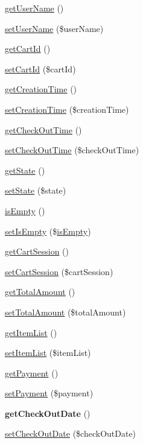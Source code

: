 \begin{DoxyCompactItemize}
\item 
\hyperlink{class_cart_aafd6d1ef27e6acc5833aba4012e5ee77}{get\+User\+Name} ()
\item 
\hyperlink{class_cart_a20f0087f72763b84d2992ba6ffee2fb2}{set\+User\+Name} (\$user\+Name)
\item 
\hyperlink{class_cart_a9fccf5809640808cf3900de0fbaf4765}{get\+Cart\+Id} ()
\item 
\hyperlink{class_cart_a241a4f559865249d8fdc9d9e9f3ae05f}{set\+Cart\+Id} (\$cart\+Id)
\item 
\hyperlink{class_cart_a8af92ba90a86c8c4abaf02cc314440f1}{get\+Creation\+Time} ()
\item 
\hyperlink{class_cart_abc11abf7b11b2b11588269d0b3d28b26}{set\+Creation\+Time} (\$creation\+Time)
\item 
\hyperlink{class_cart_a308c0ec3e87adb5aec040275fbaa5399}{get\+Check\+Out\+Time} ()
\item 
\hyperlink{class_cart_ac01239e64294f9d363a393e1bd30d37e}{set\+Check\+Out\+Time} (\$check\+Out\+Time)
\item 
\hyperlink{class_cart_afbf787ced76807989fb3093e1772c5a1}{get\+State} ()
\item 
\hyperlink{class_cart_a94042b70768a686decc42594ef36bbd6}{set\+State} (\$state)
\item 
\hyperlink{class_cart_aedcc52b3673b8df9425e52f13accb2a1}{is\+Empty} ()
\item 
\hyperlink{class_cart_a2dde1e2c7c90f8666f4869b32c36d056}{set\+Is\+Empty} (\$\hyperlink{class_cart_aedcc52b3673b8df9425e52f13accb2a1}{is\+Empty})
\item 
\hyperlink{class_cart_add88f03826fea4674a657dbb7062e559}{get\+Cart\+Session} ()
\item 
\hyperlink{class_cart_a48191a8dbb8f95ac925654237a22e6a1}{set\+Cart\+Session} (\$cart\+Session)
\item 
\hyperlink{class_cart_ae305b3e3acedd1fa9854e72f83af22c1}{get\+Total\+Amount} ()
\item 
\hyperlink{class_cart_a56860f621c6e6e47042e41fa4e59d13b}{set\+Total\+Amount} (\$total\+Amount)
\item 
\hyperlink{class_cart_a72c1264f490b6d6e5e7ba32d10fb782d}{get\+Item\+List} ()
\item 
\hyperlink{class_cart_a6fc63808e879d9282b89cc0ec214aba9}{set\+Item\+List} (\$item\+List)
\item 
\hyperlink{class_cart_a741dd11df6270bd98ec46727d5c451a4}{get\+Payment} ()
\item 
\hyperlink{class_cart_a153db0b0c72d8d7caf119482b99d2075}{set\+Payment} (\$payment)
\item 
\hypertarget{class_cart_a853842071dcbca9bc99ce12066ea726f}{{\bfseries get\+Check\+Out\+Date} ()}\label{class_cart_a853842071dcbca9bc99ce12066ea726f}

\item 
\hyperlink{class_cart_aa190af7a40e2c80b5a04f6e99cd4d429}{set\+Check\+Out\+Date} (\$check\+Out\+Date)
\end{DoxyCompactItemize}
